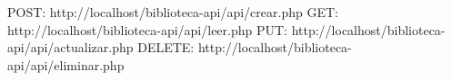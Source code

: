 POST: http://localhost/biblioteca-api/api/crear.php
GET: http://localhost/biblioteca-api/api/leer.php
PUT: http://localhost/biblioteca-api/api/actualizar.php
DELETE: http://localhost/biblioteca-api/api/eliminar.php